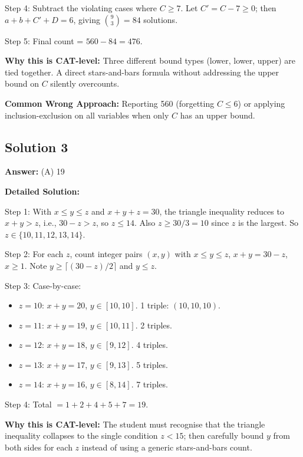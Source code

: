 \documentclass[11pt,a4paper]{article}
\begin{document}
Step 4: Subtract the violating cases where \(C \geq 7\). Let \(C' = C - 7 \geq 0\); then \(a + b + C' + D = 6\), giving \(\binom{9}{3} = 84\) solutions.

Step 5: Final count = \(560 - 84 = 476\).

\textbf{Why this is CAT-level:} Three different bound types (lower, lower, upper) are tied together. A direct stars-and-bars formula without addressing the upper bound on \(C\) silently overcounts.

\textbf{Common Wrong Approach:} Reporting 560 (forgetting \(C \leq 6\)) or applying inclusion-exclusion on all variables when only \(C\) has an upper bound.

\subsection*{Solution 3}
\textbf{Answer:} (A) 19

\textbf{Detailed Solution:}

Step 1: With \(x \leq y \leq z\) and \(x + y + z = 30\), the triangle inequality reduces to \(x + y > z\), i.e., \(30 - z > z\), so \(z \leq 14\). Also \(z \geq 30/3 = 10\) since \(z\) is the largest. So \(z \in \{10, 11, 12, 13, 14\}\).

Step 2: For each \(z\), count integer pairs \((x, y)\) with \(x \leq y \leq z\), \(x + y = 30 - z\), \(x \geq 1\). Note \(y \geq \lceil (30-z)/2 \rceil\) and \(y \leq z\).

Step 3: Case-by-case:
\begin{itemize}[leftmargin=*,topsep=0pt,itemsep=0pt]
    \item \(z = 10\): \(x + y = 20\), \(y \in [10,10]\). 1 triple: \((10,10,10)\).
    \item \(z = 11\): \(x + y = 19\), \(y \in [10,11]\). 2 triples.
    \item \(z = 12\): \(x + y = 18\), \(y \in [9,12]\). 4 triples.
    \item \(z = 13\): \(x + y = 17\), \(y \in [9,13]\). 5 triples.
    \item \(z = 14\): \(x + y = 16\), \(y \in [8,14]\). 7 triples.
\end{itemize}

Step 4: Total \(= 1 + 2 + 4 + 5 + 7 = 19\).

\textbf{Why this is CAT-level:} The student must recognise that the triangle inequality collapses to the single condition \(z < 15\); then carefully bound \(y\) from both sides for each \(z\) instead of using a generic stars-and-bars count.
\end{document}
